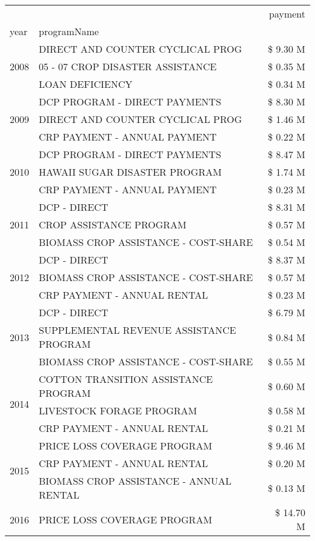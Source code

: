 \begin{tabular}{llr}
\toprule
 &  & payment \\
year & programName &  \\
\midrule
\multirow[t]{3}{*}{2008} & DIRECT AND COUNTER CYCLICAL PROG & \$ 9.30 M \\
 & 05 - 07 CROP DISASTER ASSISTANCE & \$ 0.35 M \\
 & LOAN DEFICIENCY & \$ 0.34 M \\
\cline{1-3}
\multirow[t]{3}{*}{2009} & DCP PROGRAM - DIRECT PAYMENTS & \$ 8.30 M \\
 & DIRECT AND COUNTER CYCLICAL PROG & \$ 1.46 M \\
 & CRP PAYMENT - ANNUAL PAYMENT & \$ 0.22 M \\
\cline{1-3}
\multirow[t]{3}{*}{2010} & DCP PROGRAM - DIRECT PAYMENTS & \$ 8.47 M \\
 & HAWAII SUGAR DISASTER PROGRAM & \$ 1.74 M \\
 & CRP PAYMENT - ANNUAL PAYMENT & \$ 0.23 M \\
\cline{1-3}
\multirow[t]{3}{*}{2011} & DCP - DIRECT & \$ 8.31 M \\
 & CROP ASSISTANCE PROGRAM & \$ 0.57 M \\
 & BIOMASS CROP ASSISTANCE - COST-SHARE & \$ 0.54 M \\
\cline{1-3}
\multirow[t]{3}{*}{2012} & DCP - DIRECT & \$ 8.37 M \\
 & BIOMASS CROP ASSISTANCE - COST-SHARE & \$ 0.57 M \\
 & CRP PAYMENT - ANNUAL RENTAL & \$ 0.23 M \\
\cline{1-3}
\multirow[t]{3}{*}{2013} & DCP - DIRECT & \$ 6.79 M \\
 & SUPPLEMENTAL REVENUE ASSISTANCE PROGRAM & \$ 0.84 M \\
 & BIOMASS CROP ASSISTANCE - COST-SHARE & \$ 0.55 M \\
\cline{1-3}
\multirow[t]{3}{*}{2014} & COTTON TRANSITION ASSISTANCE PROGRAM & \$ 0.60 M \\
 & LIVESTOCK FORAGE PROGRAM & \$ 0.58 M \\
 & CRP PAYMENT - ANNUAL RENTAL & \$ 0.21 M \\
\cline{1-3}
\multirow[t]{3}{*}{2015} & PRICE LOSS COVERAGE PROGRAM & \$ 9.46 M \\
 & CRP PAYMENT - ANNUAL RENTAL & \$ 0.20 M \\
 & BIOMASS CROP ASSISTANCE - ANNUAL RENTAL & \$ 0.13 M \\
\cline{1-3}
\multirow[t]{3}{*}{2016} & PRICE LOSS COVERAGE PROGRAM                   & \$ 14.70 M \\

\end{tabular}
